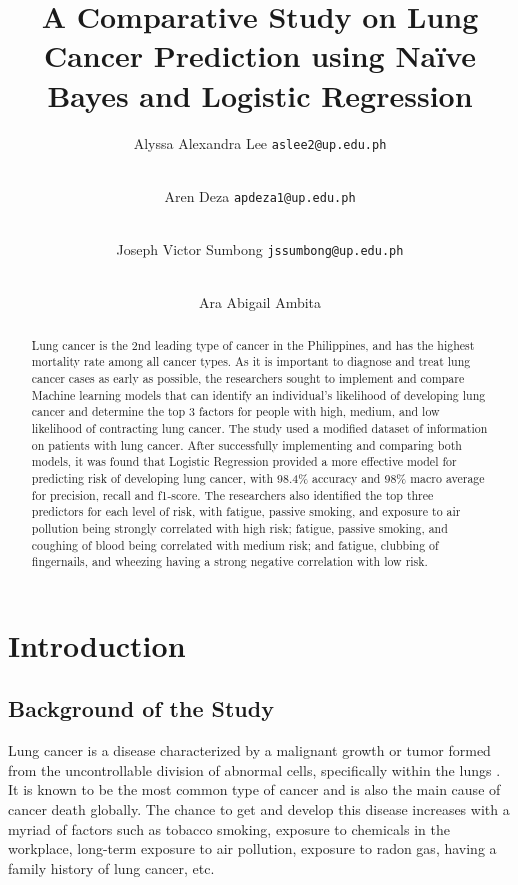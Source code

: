 \documentclass[runningheads]{llncs}
\title{\textbf{\LARGE A Comparative Study on Lung Cancer Prediction using Naïve Bayes and Logistic Regression}}
\author{Alyssa Alexandra Lee\inst{1} \texttt{aslee2@up.edu.ph} \and
\\ Aren Deza\inst{1} \texttt{apdeza1@up.edu.ph} \and
\\ Joseph Victor Sumbong\inst{1} \texttt{jssumbong@up.edu.ph} \and
\\ Ara Abigail Ambita\inst{1}}
\institute{University of The Philippines Visayas, Miag-ao, Iloilo City}
\begin{document}
\maketitle


\begin{abstract}
Lung cancer is the 2nd leading type of cancer in the Philippines, and has the highest mortality rate among all cancer types. As it is important to diagnose and treat lung cancer cases as early as possible, the researchers sought to  implement and compare Machine learning models that can identify an individual’s likelihood of developing lung cancer and determine the top 3 factors for people with high, medium, and low likelihood of contracting lung cancer. The study used a modified dataset of information on patients with lung cancer. After successfully implementing and comparing both models, it was found that Logistic Regression provided a more effective model for predicting risk of developing lung cancer, with 98.4\% accuracy and 98\% macro average for precision, recall and f1-score. The researchers also identified the top three predictors for each level of risk, with fatigue, passive smoking, and exposure to air pollution being strongly correlated with high risk; fatigue, passive smoking, and coughing of blood being correlated with medium risk; and fatigue, clubbing of fingernails, and wheezing having a strong negative correlation with low risk.


\end{abstract}

\section{Introduction}

\subsection{Background of the Study}
Lung cancer is a disease characterized by a malignant growth or tumor formed from the uncontrollable division of abnormal cells, specifically within the lungs \cite{cancerResearchUK2019}. It is known to be the most common type of cancer and is also the main cause of cancer death globally. The chance to get and develop this disease increases with a myriad of factors such as tobacco smoking, exposure to chemicals in the workplace, long-term exposure to air pollution, exposure to radon gas, having a family history of lung cancer, etc.
\end{document}
